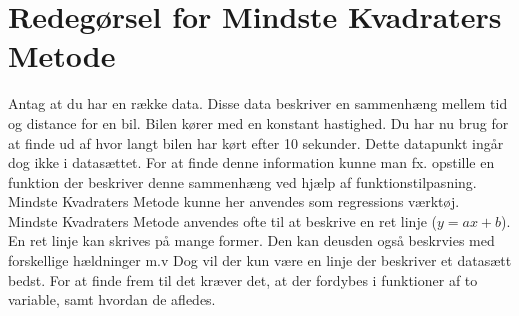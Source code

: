 \section{Redegørsel for Mindste Kvadraters Metode}\label{sec:redegorsel}
Antag at du har en række data. Disse data beskriver en sammenhæng mellem tid og distance for en bil. Bilen kører med en konstant hastighed. Du har nu brug for at finde ud af hvor langt bilen har kørt efter 10 sekunder. Dette datapunkt ingår dog ikke i datasættet. For at finde denne information kunne man fx. opstille en funktion der beskriver denne sammenhæng ved hjælp af funktionstilpasning. Mindste Kvadraters Metode kunne her anvendes som regressions værktøj. Mindste Kvadraters Metode anvendes ofte til at beskrive en ret linje (\begin{math}y = ax + b\end{math}). En ret linje kan skrives på mange former. Den kan deusden også beskrvies med forskellige hældninger m.v Dog vil der kun være en linje der beskriver et datasætt bedst. For at finde frem til det kræver det, at der fordybes i funktioner af to variable, samt hvordan de afledes.


